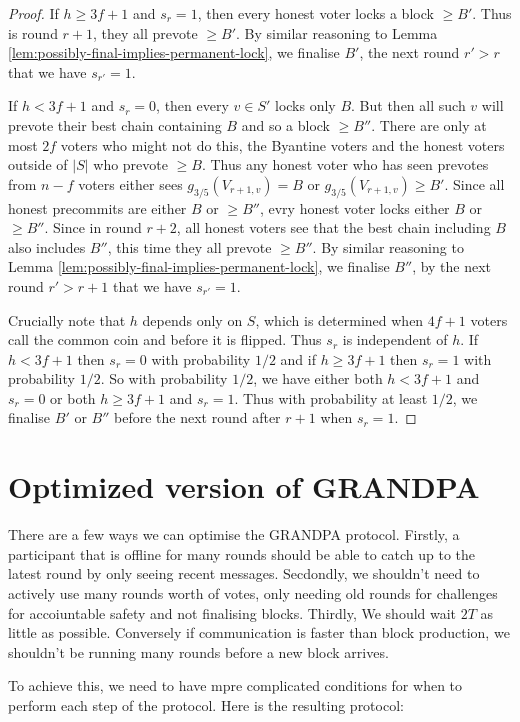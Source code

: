 \documentclass{article}
\begin{document}
\begin{proof}
If $h \geq 3f+1$ and $s_r=1$, then every honest voter locks a block $\geq B'$. Thus is round $r+1$, they all prevote $\geq B'$.
 By similar reasoning to Lemma \ref{lem:possibly-final-implies-permanent-lock}, we finalise $B'$, the next round $r' > r$ that we have $s_{r'}=1$.
 
If $h < 3f+1$ and $s_r=0$, then every $v \in S'$ locks only $B$. But then all such $v$ will prevote their best chain containing $B$ and so a block $\geq B''$. There are only at most $2f$ voters who might not do this, the Byantine voters and the honest voters outside of $|S|$ who prevote $\geq B$. Thus any honest voter who has seen prevotes from $n-f$ voters either sees $g_{3/5}(V_{r+1,v})=B$ or $g_{3/5}(V_{r+1,v}) \geq B'$. Since all honest precommits are either $B$ or $\geq B''$, evry honest voter locks either $B$ or $\geq B''$. Since in round $r+2$, all honest voters see that the best chain including $B$ also includes $B''$, this time they all prevote $\geq B''$.  By similar reasoning to Lemma \ref{lem:possibly-final-implies-permanent-lock}, we finalise $B''$, by the next round $r' > r+1$ that we have $s_{r'}=1$.

Crucially note that $h$ depends only on $S$, which is determined when $4f+1$ voters call the common coin and before it is flipped. Thus $s_r$ is independent of $h$. If $h < 3f+1$ then $s_r=0$ with probability $1/2$ and if $h \geq 3f+1$ then $s_r=1$ with probability $1/2$. So with probability $1/2$, we have either both $h < 3f+1$ and $s_r=0$ or both $h \geq 3f+1$ and $s_r=1$. Thus with probability at least $1/2$, we finalise $B'$ or $B''$ before the next round after $r+1$ when $s_r=1$.
\end{proof}

\section{Optimized version of GRANDPA}

 There are a few ways we can optimise the GRANDPA protocol.
 Firstly, a participant that is offline for many rounds should be able to catch up to the latest round by only seeing recent messages.
 Secdondly, we shouldn't need to actively use many rounds worth of votes, only needing old rounds for challenges for accoiuntable safety and not finalising blocks.
 Thirdly, We should wait $2T$ as little as possible. Conversely if communication is faster than block production, we shouldn't be running many rounds before a new block arrives.
 
 To achieve this, we need to have mpre complicated conditions for when to perform each step of the protocol. Here is the resulting protocol:
 
\end{document}
